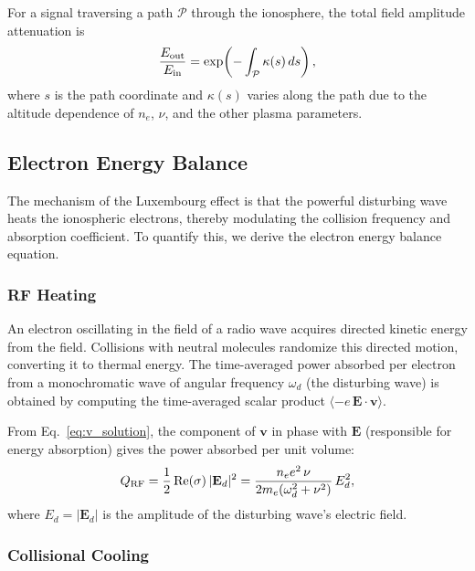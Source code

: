 \documentclass[12pt]{article}
\begin{document}
For a signal traversing a path $\mathcal{P}$ through the ionosphere, the total field
amplitude attenuation is
\begin{equation}
  \frac{E_{\rm out}}{E_{\rm in}} = \exp\!\left(-\int_{\mathcal{P}} \kappa(s)\,ds\right),
  \label{eq:path_atten}
\end{equation}
where $s$ is the path coordinate and $\kappa(s)$ varies along the path due to the altitude
dependence of $n_e$, $\nu$, and the other plasma parameters.

\subsection{Electron Energy Balance}
\label{sec:energy}

The mechanism of the Luxembourg effect is that the powerful disturbing wave heats the
ionospheric electrons, thereby modulating the collision frequency and absorption
coefficient.  To quantify this, we derive the electron energy balance equation.

\subsubsection{RF Heating}

An electron oscillating in the field of a radio wave acquires directed kinetic energy from
the field.  Collisions with neutral molecules randomize this directed motion, converting it
to thermal energy.  The time-averaged power absorbed per electron from a monochromatic wave
of angular frequency $\omega_d$ (the disturbing wave) is obtained by computing the
time-averaged scalar product $\langle -e\,\mathbf{E}\cdot\mathbf{v}\rangle$.

From Eq.~\eqref{eq:v_solution}, the component of $\mathbf{v}$ in phase with $\mathbf{E}$
(responsible for energy absorption) gives the power absorbed per unit volume:
\begin{equation}
  Q_{\rm RF} = \frac{1}{2}\operatorname{Re}(\sigma)\,|\mathbf{E}_d|^2
             = \frac{n_e e^2\,\nu}{2m_e(\omega_d^2 + \nu^2)}\,E_d^2,
  \label{eq:Qrf}
\end{equation}
where $E_d = |\mathbf{E}_d|$ is the amplitude of the disturbing wave's electric field.

\subsubsection{Collisional Cooling}
\end{document}
